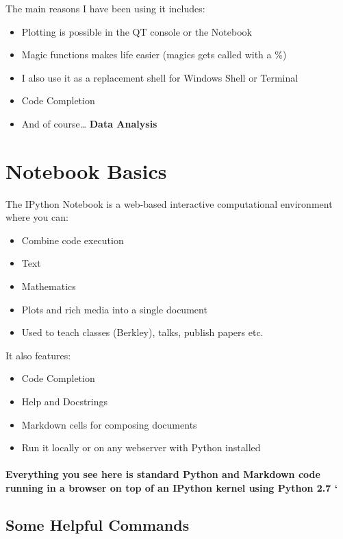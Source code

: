 \documentclass{article}
\begin{document}
The main reasons I have been using it includes:

\begin{itemize}
\item
  Plotting is possible in the QT console or the Notebook
\item
  Magic functions makes life easier (magics gets called with a \%)
\item
  I also use it as a replacement shell for Windows Shell or Terminal
\item
  Code Completion
\item
  And of course\ldots{} \textbf{Data Analysis}
\end{itemize}

    \section{Notebook Basics}

The IPython Notebook is a web-based interactive computational
environment where you can:

\begin{itemize}
\item
  Combine code execution
\item
  Text
\item
  Mathematics
\item
  Plots and rich media into a single document
\item
  Used to teach classes (Berkley), talks, publish papers etc.
\end{itemize}

It also features:

\begin{itemize}
\item
  Code Completion
\item
  Help and Docstrings
\item
  Markdown cells for composing documents
\item
  Run it locally or on any webserver with Python installed
\end{itemize}

\paragraph{Everything you see here is standard Python and Markdown code
running in a browser on top of an IPython kernel using Python 2.7 `}

    \subsection{Some Helpful Commands}
\end{document}
